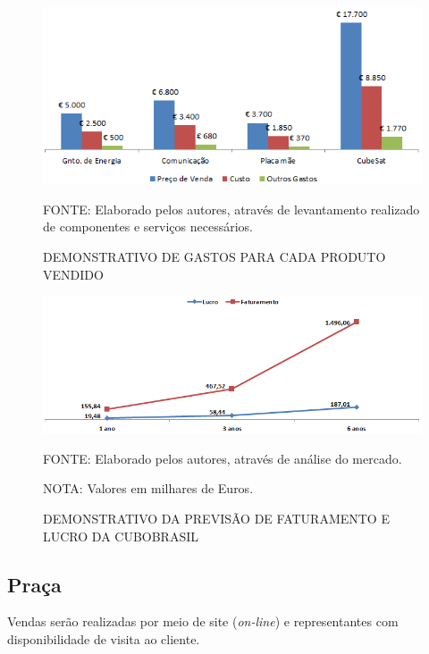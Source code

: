 \documentclass[
	12pt,				%
	openright,			%
	oneside,			%
	a4paper,			%
	english,			%
	french,				%
	spanish,			%
	brazil				%
	]{abntex2}
\begin{document}
	\begin{figure}[th]
		\caption{DEMONSTRATIVO DE GASTOS PARA CADA PRODUTO VENDIDO}
		\centering
		\includegraphics[width=1.0\linewidth]{./figs/Figura_05}
		
		\begin{small}
			FONTE: Elaborado pelos autores, através de levantamento realizado de componentes e serviços necessários.
		\end{small}
	\end{figure}
	\pagebreak	
	\begin{figure}[ht]
		\caption{DEMONSTRATIVO DA PREVISÃO DE FATURAMENTO E LUCRO DA CUBOBRASIL}
		\centering
		\includegraphics[width=1.0\linewidth]{./figs/Grafico_02}
		
		\begin{small}
			FONTE: Elaborado pelos autores, através de análise do mercado.
		\end{small}
		
		\begin{footnotesize}
			NOTA: Valores em milhares de Euros.
		\end{footnotesize}
	\end{figure}	
	
\subsection[Praça]{Praça}	

	Vendas serão realizadas por meio de site (\textit{on-line}) e representantes com disponibilidade de visita ao cliente.
	
\end{document}
